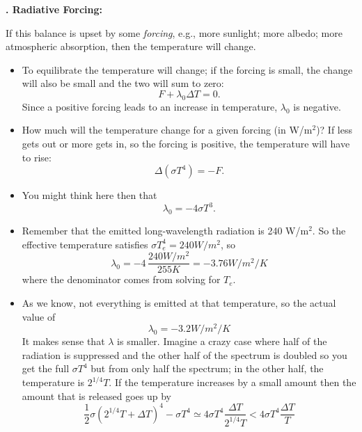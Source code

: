 \documentclass[11pt]{book}
\def\be{\begin{equation}}
\def\ee{\end{equation}}
\newcommand{\eql}[1]{\label{eq:#1}}
\newcommand\bei{\begin{itemize}}
\newcommand\eei{\end{itemize}}
\newcounter{lectureno}
\newcounter{secno}
\newcommand\lsection[1]{
\addtocounter{secno}{1}
{\bf \arabic{lectureno}.\alph{secno} #1:}}
\begin{document}
\lsection{Radiative Forcing}

If this balance is upset by some {\it forcing}, e.g., more sunlight; more albedo; more atmospheric absorption, then the temperature will change. 
\bei
\item To equilibrate the temperature will change; if the forcing is small, the change will also be small and the two will sum to zero:
\be
F + \lambda_0 \Delta T = 0.\ee
Since a positive forcing leads to an increase in temperature, $\lambda_0$ is negative.
\item How much will the temperature change for a given forcing (in W/m$^2$)? If less gets out or more gets in, so the forcing is positive, the temperature will have to rise:
\be
\Delta(\sigma T^4) = -F.\ee
\item You might think here then that
\be
\lambda_0 = -4\sigma T^3.\ee
\item Remember that the emitted long-wavelength radiation is 240 W/m$^2$. So the effective temperature satisfies $\sigma T_e^4=240W/m^2$, so
\be
\lambda_0= -4\,\frac{240 W/m^2}{255K} = -3.76 W/m^2/K\ee
where the denominator comes from solving for $T_e$.
\item As we know, not everything is emitted at that temperature, so the actual value of 
\be
\lambda_0=-3.2 W/m^2/K\eql{lambda}\ee
It makes sense that $\lambda$ is smaller. Imagine a crazy case where half of the radiation is suppressed and the other half of the spectrum is doubled so you get the full $\sigma T^4$ but from only half the spectrum; in the other half, the temperature is $2^{1/4} T$. If the temperature increases by a small amount then the amount that is released goes up by 
\be
\frac12\sigma(2^{1/4} T + \Delta T)^4 - \sigma T^4  \simeq 4\sigma T^4 \frac{\Delta T}{2^{1/4} T} < 4\sigma T^4\frac{\Delta T}{T} \ee
\eei
\end{document}
